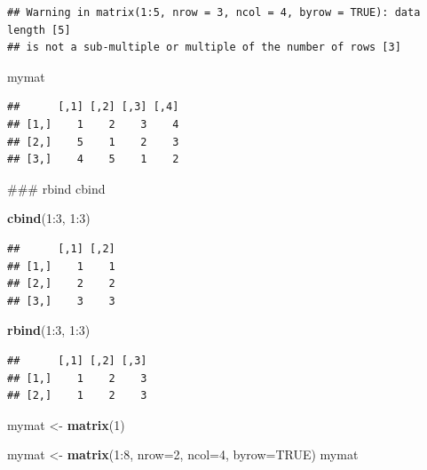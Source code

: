 \documentclass[]{book}
\newenvironment{Shaded}{\begin{snugshade}}{\end{snugshade}}
\newcommand{\KeywordTok}[1]{\textcolor[rgb]{0.13,0.29,0.53}{\textbf{{#1}}}}
\newcommand{\DataTypeTok}[1]{\textcolor[rgb]{0.13,0.29,0.53}{{#1}}}
\newcommand{\DecValTok}[1]{\textcolor[rgb]{0.00,0.00,0.81}{{#1}}}
\newcommand{\StringTok}[1]{\textcolor[rgb]{0.31,0.60,0.02}{{#1}}}
\newcommand{\OtherTok}[1]{\textcolor[rgb]{0.56,0.35,0.01}{{#1}}}
\newcommand{\NormalTok}[1]{{#1}}
\begin{document}
\begin{verbatim}
## Warning in matrix(1:5, nrow = 3, ncol = 4, byrow = TRUE): data length [5]
## is not a sub-multiple or multiple of the number of rows [3]
\end{verbatim}

\begin{Shaded}
\begin{Highlighting}[]
\NormalTok{mymat}
\end{Highlighting}
\end{Shaded}

\begin{verbatim}
##      [,1] [,2] [,3] [,4]
## [1,]    1    2    3    4
## [2,]    5    1    2    3
## [3,]    4    5    1    2
\end{verbatim}

\begin{Shaded}
\begin{Highlighting}[]
\NormalTok{### rbind  cbind}

\KeywordTok{cbind}\NormalTok{(}\DecValTok{1}\NormalTok{:}\DecValTok{3}\NormalTok{, }\DecValTok{1}\NormalTok{:}\DecValTok{3}\NormalTok{)}
\end{Highlighting}
\end{Shaded}

\begin{verbatim}
##      [,1] [,2]
## [1,]    1    1
## [2,]    2    2
## [3,]    3    3
\end{verbatim}

\begin{Shaded}
\begin{Highlighting}[]
\KeywordTok{rbind}\NormalTok{(}\DecValTok{1}\NormalTok{:}\DecValTok{3}\NormalTok{, }\DecValTok{1}\NormalTok{:}\DecValTok{3}\NormalTok{)}
\end{Highlighting}
\end{Shaded}

\begin{verbatim}
##      [,1] [,2] [,3]
## [1,]    1    2    3
## [2,]    1    2    3
\end{verbatim}

\begin{Shaded}
\begin{Highlighting}[]
\NormalTok{mymat <-}\StringTok{ }\KeywordTok{matrix}\NormalTok{(}\DecValTok{1}\NormalTok{)}

\NormalTok{mymat <-}\StringTok{ }\KeywordTok{matrix}\NormalTok{(}\DecValTok{1}\NormalTok{:}\DecValTok{8}\NormalTok{, }\DataTypeTok{nrow=}\DecValTok{2}\NormalTok{, }\DataTypeTok{ncol=}\DecValTok{4}\NormalTok{, }\DataTypeTok{byrow=}\OtherTok{TRUE}\NormalTok{)}
\NormalTok{mymat}
\end{Highlighting}
\end{Shaded}
\end{document}
